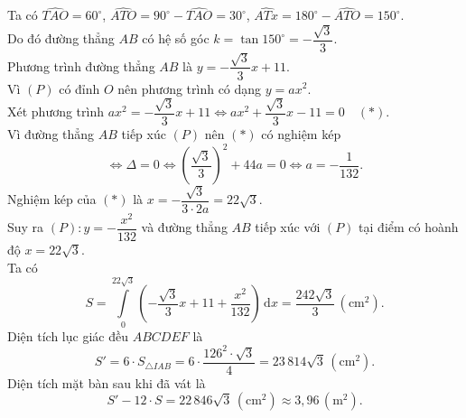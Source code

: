 \begin{ex}
{		Ta có $\widehat{TAO}=60^\circ$, $\widehat{ATO}=90^\circ-\widehat{TAO}=30^\circ$, $\widehat{ATx}=180^\circ-\widehat{ATO}=150^\circ$. \\
		Do đó đường thẳng $AB$ có hệ số góc $k=\tan 150^\circ=-\dfrac{\sqrt{3}}{3}$. \\
		Phương trình đường thẳng $AB$ là $y=-\dfrac{\sqrt{3}}{3}x+11$. \\
		Vì $(P)$ có đỉnh $O$ nên phương trình có dạng $y=ax^2$. \\
		Xét phương trình $ax^2=-\dfrac{\sqrt{3}}{3}x+11 \Leftrightarrow ax^2+\dfrac{\sqrt{3}}{3}x-11=0 \quad (*)$. \\
		Vì đường thẳng $AB$ tiếp xúc $(P)$ nên $(*)$ có nghiệm kép 
		\[\Leftrightarrow \Delta=0 \Leftrightarrow \left(\dfrac{\sqrt{3}}{3}\right)^2+44a=0 \Leftrightarrow a=-\dfrac{1}{132}.\]
		Nghiệm kép của $(*)$ là $x=-\dfrac{\sqrt{3}}{3 \cdot 2a}=22\sqrt{3}$. \\
		Suy ra $(P) \colon y=-\dfrac{x^2}{132}$ và đường thẳng $AB$ tiếp xúc với $(P)$ tại điểm có hoành độ $x=22\sqrt{3}$. \\
		Ta có \[S=\displaystyle\int\limits_0^{22\sqrt{3}} \left(-\dfrac{\sqrt{3}}{3}x+11+\dfrac{x^2}{132}\right)\mathrm{\,d}x=\dfrac{242\sqrt{3}}{3} \, \left(\text{cm}^2\right).\]
		Diện tích lục giác đều $ABCDEF$ là 
		\[S'=6 \cdot S_{\triangle IAB}=6 \cdot \dfrac{126^2 \cdot \sqrt{3}}{4}=23\,814\sqrt{3} \, \left(\text{cm}^2\right).\]
		Diện tích mặt bàn sau khi đã vát là
		\[S'-12 \cdot S =22\,846\sqrt{3} \, \left(\text{cm}^2\right) \approx 3{,}96 \, \left(\text{m}^2\right).\]
	}
\end{ex}


